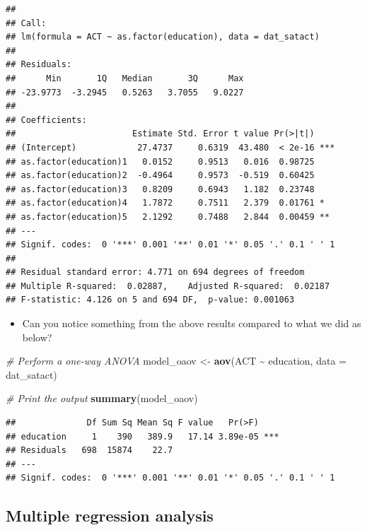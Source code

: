 \documentclass[
]{book}
\newenvironment{Shaded}{\begin{snugshade}}{\end{snugshade}}
\newcommand{\AttributeTok}[1]{\textcolor[rgb]{0.13,0.29,0.53}{#1}}
\newcommand{\CommentTok}[1]{\textcolor[rgb]{0.56,0.35,0.01}{\textit{#1}}}
\newcommand{\FunctionTok}[1]{\textcolor[rgb]{0.13,0.29,0.53}{\textbf{#1}}}
\newcommand{\NormalTok}[1]{#1}
\newcommand{\OtherTok}[1]{\textcolor[rgb]{0.56,0.35,0.01}{#1}}
\newcommand{\SpecialCharTok}[1]{\textcolor[rgb]{0.81,0.36,0.00}{\textbf{#1}}}
\providecommand{\tightlist}{%
  \setlength{\itemsep}{0pt}\setlength{\parskip}{0pt}}
\begin{document}
\begin{verbatim}
## 
## Call:
## lm(formula = ACT ~ as.factor(education), data = dat_satact)
## 
## Residuals:
##      Min       1Q   Median       3Q      Max 
## -23.9773  -3.2945   0.5263   3.7055   9.0227 
## 
## Coefficients:
##                       Estimate Std. Error t value Pr(>|t|)    
## (Intercept)            27.4737     0.6319  43.480  < 2e-16 ***
## as.factor(education)1   0.0152     0.9513   0.016  0.98725    
## as.factor(education)2  -0.4964     0.9573  -0.519  0.60425    
## as.factor(education)3   0.8209     0.6943   1.182  0.23748    
## as.factor(education)4   1.7872     0.7511   2.379  0.01761 *  
## as.factor(education)5   2.1292     0.7488   2.844  0.00459 ** 
## ---
## Signif. codes:  0 '***' 0.001 '**' 0.01 '*' 0.05 '.' 0.1 ' ' 1
## 
## Residual standard error: 4.771 on 694 degrees of freedom
## Multiple R-squared:  0.02887,    Adjusted R-squared:  0.02187 
## F-statistic: 4.126 on 5 and 694 DF,  p-value: 0.001063
\end{verbatim}

\begin{itemize}
\tightlist
\item
  Can you notice something from the above results compared to what we did as below?
\end{itemize}

\begin{Shaded}
\begin{Highlighting}[]
\CommentTok{\# Perform a one{-}way ANOVA}
\NormalTok{model\_oaov }\OtherTok{\textless{}{-}} \FunctionTok{aov}\NormalTok{(ACT }\SpecialCharTok{\textasciitilde{}}\NormalTok{ education, }\AttributeTok{data =}\NormalTok{ dat\_satact)}

\CommentTok{\# Print the output}
\FunctionTok{summary}\NormalTok{(model\_oaov)}
\end{Highlighting}
\end{Shaded}

\begin{verbatim}
##              Df Sum Sq Mean Sq F value   Pr(>F)    
## education     1    390   389.9   17.14 3.89e-05 ***
## Residuals   698  15874    22.7                     
## ---
## Signif. codes:  0 '***' 0.001 '**' 0.01 '*' 0.05 '.' 0.1 ' ' 1
\end{verbatim}

\subsection{Multiple regression analysis}\label{multiple-regression-analysis}
\end{document}
